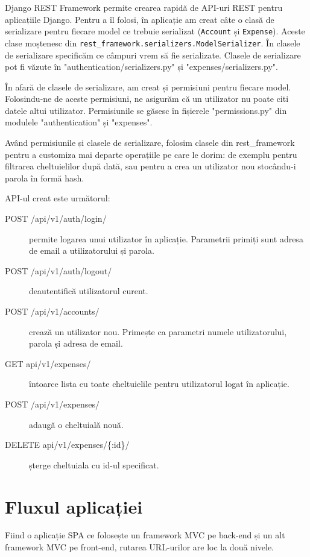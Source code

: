 Django REST Framework permite crearea rapidă de API-uri REST pentru 
aplicațiile Django. Pentru a îl folosi, în aplicație am creat
câte o clasă de serializare pentru fiecare model 
ce trebuie serializat (\texttt{Account} și \texttt{Expense}).
Aceste clase moștenesc din \texttt{rest\_framework.serializers.ModelSerializer}.
În clasele de serializare specificăm ce câmpuri vrem să fie serializate.
Clasele de serializare pot fi văzute în "authentication/serializers.py"
și "expenses/serializers.py".

În afară de clasele de serializare, am creat și permisiuni pentru fiecare
model. Folosindu-ne de aceste permisiuni, ne asigurăm că un utilizator
nu poate citi datele altui utilizator. Permisiunile se găsesc
în fișierele "permissions.py" din modulele "authentication" și
"expenses".

Având permisiunile și clasele de serializare, folosim clasele
din rest\_framework pentru a customiza mai departe
operațiile pe care le dorim: de exemplu pentru filtrarea 
cheltuielilor după dată, sau pentru a crea un utilizator nou
stocându-i parola în formă hash.

API-ul creat este următorul:
\begin{description}
\item [POST /api/v1/auth/login/] permite logarea unui
utilizator în aplicație. Parametrii primiți sunt
adresa de email a utilizatorului și parola.
\item [POST /api/v1/auth/logout/] deautentifică
utilizatorul curent.
\item [POST /api/v1/accounts/] crează un utilizator nou.
Primește ca parametri numele utilizatorului, parola
și adresa de email.
\item [GET api/v1/expenses/] întoarce lista cu toate
cheltuielile pentru utilizatorul logat în aplicație.
\item [POST /api/v1/expenses/] adaugă o cheltuială
nouă.
\item [DELETE api/v1/expenses/\{:id\}/] șterge cheltuiala
cu id-ul specificat.
\end{description}


\section{Fluxul aplicației}

Fiind o aplicație SPA ce folosește un framework MVC
pe back-end și un alt framework MVC pe front-end,
rutarea URL-urilor are loc la două nivele.

